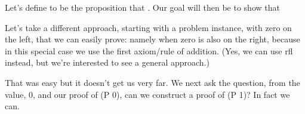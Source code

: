 \documentclass[letterpaper,10pt,english]{sphinxmanual}
\begin{document}
\sphinxAtStartPar
Let’s define  to be the proposition that
. Our goal will then be to show that

\begin{sphinxVerbatim}[commandchars=\\\{\}]
            

       
\end{sphinxVerbatim}

\sphinxAtStartPar
Let’s take a different approach, starting with
a problem instance, with zero on the left, that
we can easily prove: namely when zero is also on
the right, because in this special case we 
use the first axiom/rule of addition. (Yes, we
can use rfl instead, but we’re interested to see
a general approach.)

\begin{sphinxVerbatim}[commandchars=\\\{\}]
     
          
 \PYG{o}{[}\PYG{o}{]}        

\end{sphinxVerbatim}

\sphinxAtStartPar
That was easy but it doesn’t get us very far. We
next ask the question, from the value, 0, and our
proof of (P 0), can we construct a proof of (P 1)?
In fact we can.

\begin{sphinxVerbatim}[commandchars=\\\{\}]
     
 
   
   
       
 
\end{sphinxVerbatim}
\end{document}
